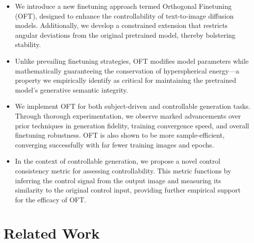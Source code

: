 \begin{itemize}[leftmargin=*,nosep]

    \item We introduce a new finetuning approach termed Orthogonal Finetuning (OFT), designed to enhance the controllability of text-to-image diffusion models. Additionally, we develop a constrained extension that restricts angular deviations from the original pretrained model, thereby bolstering stability.
    \item Unlike prevailing finetuning strategies, OFT modifies model parameters while mathematically guaranteeing the conservation of hyperspherical energy—a property we empirically identify as critical for maintaining the pretrained model's generative semantic integrity.
    \item We implement OFT for both subject-driven and controllable generation tasks. Through thorough experimentation, we observe marked advancements over prior techniques in generation fidelity, training convergence speed, and overall finetuning robustness. OFT is also shown to be more sample-efficient, converging successfully with far fewer training images and epochs.
    \item In the context of controllable generation, we propose a novel control consistency metric for assessing controllability. This metric functions by inferring the control signal from the output image and measuring its similarity to the original control input, providing further empirical support for the efficacy of OFT.
\end{itemize}

\section{Related Work}

